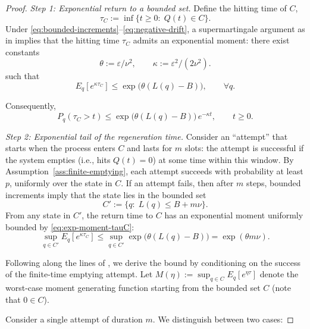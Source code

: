 \documentclass[11pt]{article}
\begin{document}
\begin{proof}

\textit{Step 1: Exponential return to a bounded set.}
Define the hitting time of $C$,
\[
\tau_C := \inf\{t\ge 0:\; Q(t)\in C\}.
\]
Under \eqref{eq:bounded-increments}--\eqref{eq:negative-drift}, a supermartingale argument
as in \cite{hajek1982hitting} implies that the hitting time $\tau_C$ admits an exponential moment:
there exist constants 
\begin{equation}
\label{eq:alpha-kappa}
\theta := \varepsilon/\nu^2,
\qquad
\kappa := \varepsilon^2/(2\nu^2).
\end{equation}
such that
\begin{equation}
\label{eq:exp-moment-tauC}
{E}_q\!\left[e^{\kappa \tau_C}\right]
\le
\exp\!\big(\theta(L(q)-B)\big),
\qquad \forall q.
\end{equation}

Consequently,
\begin{equation}
\label{eq:tail-tauC}
P_q(\tau_C>t)
\le
\exp\!\big(\theta(L(q)-B)\big)\,e^{-\kappa t},
\qquad t\ge 0.
\end{equation}

\textit{Step 2: Exponential tail of the regeneration time.}
Consider an ``attempt'' that starts when the process enters $C$ and lasts for $m$ slots:
the attempt is successful if the system empties (i.e., hits $Q(t)=0$) at some time within this window.
By Assumption~\ref{ass:finite-emptying}, each attempt succeeds with probability at least $p$, uniformly over the state in $C$.
If an attempt fails, then after $m$ steps, bounded increments imply that the state lies in the bounded set
\[
C' := \{q:\;
L(q)\le B+m\nu\}.
\]
From any state in $C'$, the return time to $C$ has an exponential moment uniformly bounded
by \eqref{eq:exp-moment-tauC}:
\begin{equation}
\label{eq:uniform-exp-moment-from-Cprime}
\sup_{q\in C'} E_q\!\left[e^{\kappa \tau_C}\right]
\le
\sup_{q\in C'} \exp\!\big(\theta(L(q)-B)\big)
=
\exp(\theta m\nu).
\end{equation}

Following along the lines of \cite{asmussen2007applied,meyn2009markov}, we derive the bound by conditioning on the success of the finite-time emptying attempt. Let $M(\eta) := \sup_{q \in C} E_q[e^{\eta \tau}]$ denote the worst-case moment generating function starting from the bounded set $C$ (note that $0 \in C$).

Consider a single attempt of duration $m$. We distinguish between two cases:


\end{proof}
\end{document}
